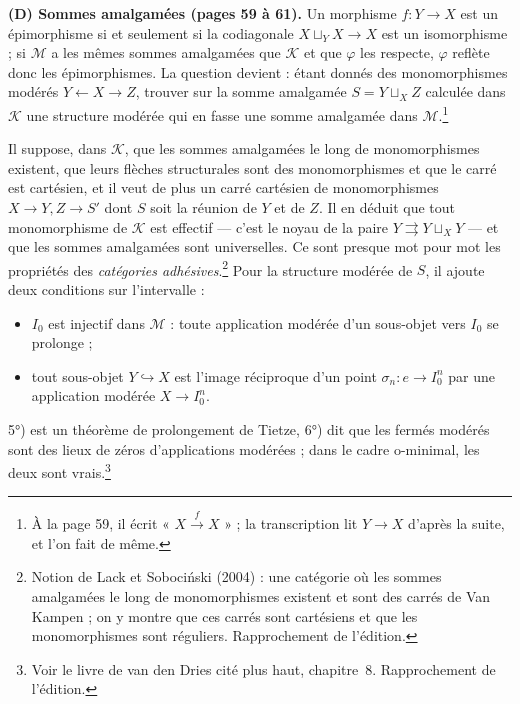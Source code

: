 \documentclass[11pt,a4paper]{article}
\begin{document}
\textbf{(D) Sommes amalgamées (pages 59 à 61).} Un morphisme $f : Y \to X$ est
un épimorphisme si et seulement si la codiagonale $X \sqcup_Y X \to X$ est un
isomorphisme ; si $\mathcal{M}$ a les mêmes sommes amalgamées que $\mathcal{K}$
et que $\varphi$ les respecte, $\varphi$ reflète donc les épimorphismes. La
question devient : étant donnés des monomorphismes modérés $Y \leftarrow X
\rightarrow Z$, trouver sur la somme amalgamée $S = Y \sqcup_X Z$ calculée dans
$\mathcal{K}$ une structure modérée qui en fasse une somme amalgamée dans
$\mathcal{M}$.\footnote{À la page 59, il écrit « $X \xrightarrow{f} X$ » ; la
transcription lit $Y \to X$ d'après la suite, et l'on fait de même.}

Il suppose, dans $\mathcal{K}$, que les sommes amalgamées le long de
monomorphismes existent, que leurs flèches structurales sont des monomorphismes
et que le carré est cartésien, et il veut de plus un carré cartésien de
monomorphismes $X \to Y, Z \to S'$ dont $S$ soit la réunion de $Y$ et de $Z$.
Il en déduit que tout monomorphisme de $\mathcal{K}$ est effectif — c'est le
noyau de la paire $Y \rightrightarrows Y \sqcup_X Y$ — et que les sommes
amalgamées sont universelles. Ce sont presque mot pour mot les propriétés
des \emph{catégories adhésives}.\footnote{Notion de Lack et Sobociński (2004) :
une catégorie où les sommes amalgamées le long de monomorphismes existent et
sont des carrés de Van Kampen ; on y montre que ces carrés sont cartésiens et
que les monomorphismes sont réguliers. Rapprochement de l'édition.} Pour la
structure modérée de $S$, il ajoute deux conditions sur l'intervalle :

\begin{itemize}
\item[5°)] $I_0$ est injectif dans $\mathcal{M}$ : toute application modérée
  d'un sous-objet vers $I_0$ se prolonge ;
\item[6°)] tout sous-objet $Y \hookrightarrow X$ est l'image réciproque d'un
  point $\sigma_n : e \to I_0^n$ par une application modérée $X \to I_0^n$.
\end{itemize}

5°) est un théorème de prolongement de Tietze, 6°) dit que les fermés modérés
sont des lieux de zéros d'applications modérées ; dans le cadre o-minimal, les
deux sont vrais.\footnote{Voir le livre de van den Dries cité plus haut,
chapitre~8. Rapprochement de l'édition.}
\end{document}
